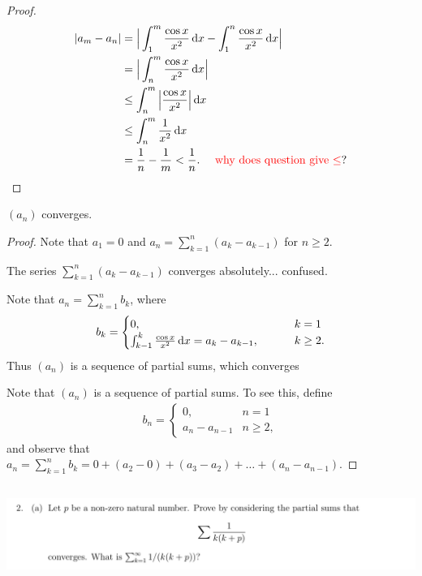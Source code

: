 \documentclass[12pt]{article}
\begin{document}

\begin{proof}
  \begin{align*}
    |a_m - a_n| &=    \Big| \int_1^m \frac{\cos x}{x^2} \dx - \int_1^n \frac{\cos x}{x^2} \dx \Big|\\
                &=    \Big| \int_n^m \frac{\cos x}{x^2} \dx \Big|\\
                &\leq \int_n^m \Big| \frac{\cos x}{x^2} \Big| \dx \\
                &\leq \int_n^m \frac{1}{x^2} \dx \\
                &= \frac{1}{n} - \frac{1}{m}
                < \frac{1}{n}. ~~~~\text{\red{why does question give $\leq$}?}
  \end{align*}
\end{proof}
\begin{claim*}
  $(a_n)$ converges.
\end{claim*}
\begin{proof}
  Note that $a_1 = 0$ and $a_n = \sum_{k=1}^n (a_{k} - a_{k-1})$ for $n \geq 2$.

  The series $\sum_{k=1}^n (a_{k} - a_{k-1})$ converges absolutely... confused.

  Note that $a_n = \sum_{k=1}^n b_k$, where
  \begin{align*}
    b_k =
    \begin{cases}
      0,     ~~~~~~~~~~~~~~&k = 1\\
      \int_{k-1}^k \frac{\cos x}{x^2} \dx = a_{k} - a_{k-1},   ~~~~~~~&k \geq 2.
    \end{cases}
  \end{align*}
  Thus $(a_n)$ is a sequence of partial sums, which converges

  Note that $(a_n)$ is a sequence of partial sums. To see this, define
  \begin{align*}
    b_n =
    \begin{cases}
      0,     ~~~~~~~&n = 1\\
      a_n - a_{n-1}  &n \geq 2,
    \end{cases}
  \end{align*}
  and observe that $a_n = \sum_{k=1}^n b_k = 0 + (a_2 - 0) + (a_3 - a_2) + \ldots + (a_n - a_{n - 1})$.

\end{proof}

\newpage
\subsection{}
\begin{mdframed}
\includegraphics[width=400pt]{img/analysis--oxford-M2-I-5-2-a.png}
\end{mdframed}
\end{document}
